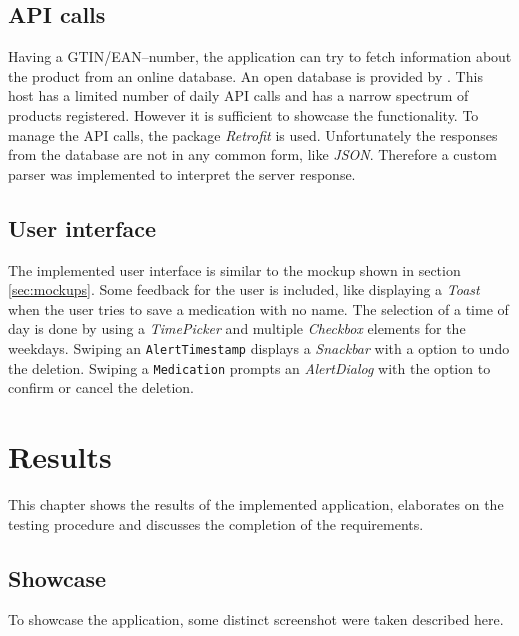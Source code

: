 \documentclass[conference]{IEEEtran}
\begin{document}
\subsection{API calls}
Having a GTIN/EAN--number, the application can try to fetch information about the product from an online database.
An open database is provided by \cite{eandatabase}. This host has a limited number of daily API calls and has a
narrow spectrum of products registered. However it is sufficient to showcase the functionality. To manage the API
calls, the package \textit{Retrofit} \cite{retrofit} is used. Unfortunately the responses from the database are not
in any common form, like \textit{JSON}. Therefore a custom parser was implemented to interpret the server response.

\subsection{User interface}
The implemented user interface is similar to the mockup shown in section \ref{sec:mockups}. Some feedback for the
user is included, like displaying a \textit{Toast} when the user tries to save a medication with no name. The
selection of a time of day is done by using a \textit{TimePicker} and multiple \textit{Checkbox} elements for the
weekdays. Swiping an \texttt{AlertTimestamp} displays a \textit{Snackbar} with a option to undo the deletion.
Swiping a \texttt{Medication} prompts an \textit{AlertDialog} with the option to confirm or cancel the deletion.

\section{Results}
This chapter shows the results of the implemented application, elaborates on the testing procedure and discusses
the completion of the requirements.

\subsection{Showcase}
To showcase the application, some distinct screenshot were taken described here.
\end{document}
